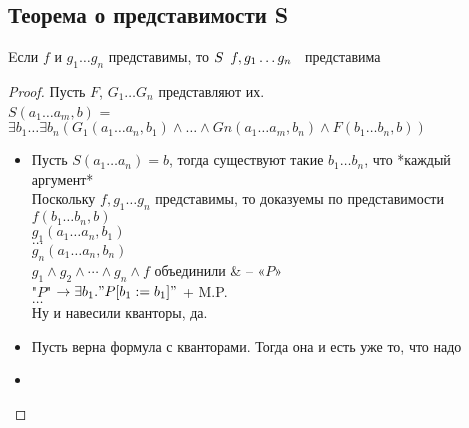 \subsection{Теорема о представимости S}
\label{sec-11-5}
\begin{lemma}
Eсли $f$ и $g_1 \dots g_n$ представимы, то $S\template{f, g_1 \dots g_n}$ представима
\end{lemma}
\begin{proof}
Пусть $F$, $G_1 \dots G_n$ представляют их.\\
$S(a_1 \dots a_m, b)$ = $\exists b_1 \dots \exists b_n(G_1(a_1\dots a_n, b_1) \land \dots \land Gn(a_1 \dots a_m, b_n) \land F(b_1\dots b_n, b))$
\begin{itemize}
\item Пусть $S(a_1 \dots a_n) = b$, тогда существуют такие $b_1 \dots b_n$, что *каждый аргумент*\\
Поскольку $f, g_1 \dots g_n$ представимы, то доказуемы по представимости\\
$f(b_1 \dots b_n, b)$\\
$g_1(a_1 \dots a_n, b_1)$\\
$\dots$\\
$g_n(a_1 \dots a_n, b_n)$\\
$g_1 \land g_2 \land \dotsb  \land g_n \land f$ объединили \& -- «$P$»\\
"$P$" $\to \exists b_1."P[b_1:=b_1]"$ + M.P.\\
$\dots$\\
Ну и навесили кванторы, да.
\item Пусть верна формула с кванторами. Тогда она и есть уже то, что надо
\item {}
\end{itemize}
\end{proof}
